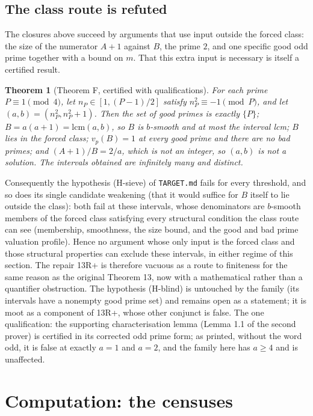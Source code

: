 \documentclass[11pt]{article}
\newtheorem{theorem}{Theorem}[section]
\theoremstyle{remark}
\begin{document}
\subsection{The class route is refuted}

The closures above succeed by arguments that use input outside the forced class: the size of the numerator $A + 1$ against $B$, the prime $2$, and one specific good odd prime together with a bound on $m$. That this extra input is necessary is itself a certified result.

\begin{theorem}[Theorem F, certified with qualifications]
For each prime $P \equiv 1 \pmod 4$, let $n_P \in [1, (P-1)/2]$ satisfy $n_P^2 \equiv -1 \pmod P$, and let $(a, b) = (n_P^2, n_P^2 + 1)$. Then the set of good primes is exactly $\{P\}$; $B = a(a+1) = \mathrm{lcm}(a, b)$, so $B$ is $b$-smooth and at most the interval lcm; $B$ lies in the forced class; $v_p(B) = 1$ at every good prime and there are no bad primes; and $(A+1)/B = 2/a$, which is not an integer, so $(a,b)$ is not a solution. The intervals obtained are infinitely many and distinct.
\end{theorem}

Consequently the hypothesis (H-sieve) of \texttt{TARGET.md} fails for every threshold, and so does its single candidate weakening (that it would suffice for $B$ itself to lie outside the class): both fail at these intervals, whose denominators are $b$-smooth members of the forced class satisfying every structural condition the class route can see (membership, smoothness, the size bound, and the good and bad prime valuation profile). Hence no argument whose only input is the forced class and those structural properties can exclude these intervals, in either regime of this section. The repair 13R+ is therefore vacuous as a route to finiteness for the same reason as the original Theorem 13, now with a mathematical rather than a quantifier obstruction. The hypothesis (H-blind) is untouched by the family (its intervals have a nonempty good prime set) and remains open as a statement; it is moot as a component of 13R+, whose other conjunct is false. The one qualification: the supporting characterisation lemma (Lemma 1.1 of the second prover) is certified in its corrected odd prime form; as printed, without the word odd, it is false at exactly $a = 1$ and $a = 2$, and the family here has $a \ge 4$ and is unaffected.

\section{Computation: the censuses}
\end{document}
